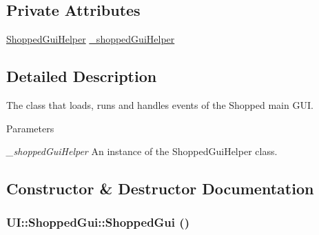 \subsection*{Private Attributes}
\begin{DoxyCompactItemize}
\item 
\hyperlink{class_core_1_1_shopped_gui_helper}{ShoppedGuiHelper} \hyperlink{class_u_i_1_1_shopped_gui_a19139212d3779912c914ee07e2365cf6}{\_\-shoppedGuiHelper}
\end{DoxyCompactItemize}


\subsection{Detailed Description}
The class that loads, runs and handles events of the Shopped main GUI.


\begin{DoxyParams}{Parameters}
\item[{\em \_\-shoppedGuiHelper}]An instance of the ShoppedGuiHelper class. \end{DoxyParams}


\subsection{Constructor \& Destructor Documentation}
\hypertarget{class_u_i_1_1_shopped_gui_a3aa57a391c2005ffafa61ff34be5d4b6}{
\subsubsection[{ShoppedGui}]{\setlength{\rightskip}{0pt plus 5cm}UI::ShoppedGui::ShoppedGui ()}}
\label{class_u_i_1_1_shopped_gui_a3aa57a391c2005ffafa61ff34be5d4b6}


